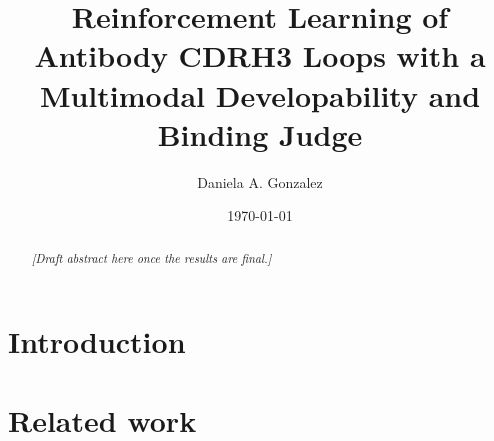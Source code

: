 \documentclass[11pt]{article}
\title{Reinforcement Learning of Antibody CDRH3 Loops with a Multimodal
Developability and Binding Judge}
\author[1]{Daniela A. Gonzalez}
\affil[1]{Affiliation}
\date{\today}
\begin{document}
\maketitle

\begin{abstract}
\textit{[Draft abstract here once the results are final.]}
\end{abstract}

\section{Introduction}

\section{Related work}
\end{document}
